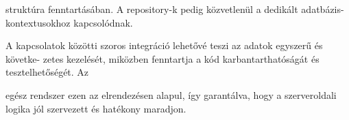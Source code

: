 struktúra fenntartásában. A repository-k pedig közvetlenül a dedikált adatbázis-kontextusokhoz kapcsolódnak.

A kapcsolatok közötti szoros integráció lehetővé teszi az adatok egyszerű és követke-
zetes kezelését, miközben fenntartja a kód karbantarthatóságát és tesztelhetőségét. Az

egész rendszer ezen az elrendezésen alapul, így garantálva, hogy a szerveroldali logika
jól szervezett és hatékony maradjon.